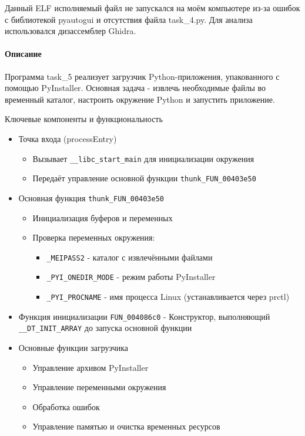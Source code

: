     Данный ELF исполняемый файл не запускался на моём компьютере из-за ошибок с библиотекой pyautogui и
    отсутствия файла task\_4.py. Для анализа использовался дизассемблер Ghidra.

    \paragraph{Описание}
    Программа task\_5 реализует загрузчик Python-приложения, упакованного с помощью PyInstaller.
    Основная задача - извлечь необходимые файлы во временный каталог, настроить окружение Python и запустить приложение.

    Ключевые компоненты и функциональность
    \begin{itemize}
        \item Точка входа (processEntry)
        \begin{itemize}
            \item Вызывает \texttt{\_\_libc\_start\_main} для инициализации окружения
            \item Передаёт управление основной функции \texttt{thunk\_FUN\_00403e50}
        \end{itemize}
        \item Основная функция \texttt{thunk\_FUN\_00403e50}
        \begin{itemize}
            \item Инициализация буферов и переменных
            \item Проверка переменных окружения:
            \begin{itemize}
                \item \texttt{\_MEIPASS2} - каталог с извлечёнными файлами
                \item \texttt{\_PYI\_ONEDIR\_MODE} - режим работы PyInstaller
                \item \texttt{\_PYI\_PROCNAME} - имя процесса Linux (устанавливается через prctl)
            \end{itemize}
        \end{itemize}
        \item Функция инициализации \texttt{FUN\_004086c0} - Конструктор, выполняющий \texttt{\_\_DT\_INIT\_ARRAY}
        до запуска основной функции
        \item Основные функции загрузчика
        \begin{itemize}
            \item Управление архивом PyInstaller
            \item Управление переменными окружения
            \item Обработка ошибок
            \item Управление памятью и очистка временных ресурсов
        \end{itemize}


    \end{itemize}

